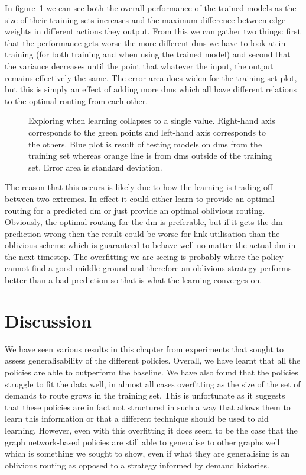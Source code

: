 In figure~\ref{fig:exp_fail} we can see both the overall performance of the trained models as the size of their training sets increases and the maximum difference between edge weights in different actions they output. From this we can gather two things: first that the performance gets worse the more different \acp{dm} we have to look at in training (for both training and when using the trained model) and second that the variance decreases until the point that whatever the input, the output remains effectively the same. The error area does widen for the training set plot, but this is simply an effect of adding more \acp{dm} which all have different relations to the optimal routing from each other.

\begin{figure}
    \centering
    
    \caption{Exploring when learning collapses to a single value. Right-hand axis corresponds to the green points and left-hand axis corresponds to the others. Blue plot is result of testing models on \acp{dm} from the training set whereas orange line is from \acp{dm} outside of the training set. Error area is standard deviation.}
    \label{fig:exp_fail}
\end{figure}

The reason that this occurs is likely due to how the learning is trading off between two extremes. In effect it could either learn to provide an optimal routing for a predicted \ac{dm} or just provide an optimal oblivious routing. Obviously, the optimal routing for the \ac{dm} is preferable, but if it gets the \ac{dm} prediction wrong then the result could be worse for link utilisation than the oblivious scheme which is guaranteed to behave well no matter the actual \ac{dm} in the next timestep. The overfitting we are seeing is probably where the policy cannot find a good middle ground and therefore an oblivious strategy performs better than a bad prediction so that is what the learning converges on.


\section{Discussion}
We have seen various results in this chapter from experiments that sought to assess generalisability of the different policies. Overall, we have learnt that all the policies are able to outperform the baseline. We have also found that the policies struggle to fit the data well, in almost all cases overfitting as the size of the set of demands to route grows in the training set. This is unfortunate as it suggests that these policies are in fact not structured in such a way that allows them to learn this information or that a different technique should be used to aid learning. However, even with this overfitting it does seem to be the case that the graph network-based policies are still able to generalise to other graphs well which is something we sought to show, even if what they are generalising is an oblivious routing as opposed to a strategy informed by demand histories.

